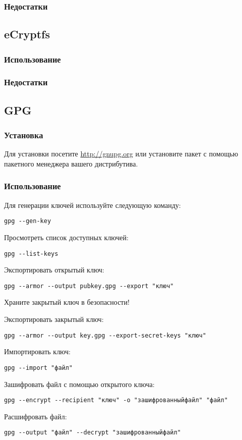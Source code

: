 \subsubsection{Недостатки}
\subsection{eCryptfs}
\subsubsection{Использование}
\subsubsection{Недостатки}
\subsection{GPG}
\subsubsection{Установка}
Для установки посетите \url{http://gnupg.org} или установите пакет с помощью пакетного менеджера вашего дистрибутива.
\subsubsection{Использование}
Для генерации ключей используйте следующую команду:
\begin{lstlisting}
gpg --gen-key
\end{lstlisting}
Просмотреть список доступных ключей:
\begin{lstlisting}
gpg --list-keys
\end{lstlisting}
Экспортировать открытый ключ:
\begin{lstlisting}
gpg --armor --output pubkey.gpg --export "ключ"
\end{lstlisting}
\begin{important}
Храните закрытый ключ в безопасности!
\end{important}
Экспортировать закрытый ключ:
\begin{lstlisting}
gpg --armor --output key.gpg --export-secret-keys "ключ"
\end{lstlisting}
Импортировать ключ:
\begin{lstlisting}
gpg --import "файл"
\end{lstlisting}
Зашифровать файл с помощью открытого ключа:
\begin{lstlisting}
gpg --encrypt --recipient "ключ" -o "зашифрованныйфайл" "файл"
\end{lstlisting}
Расшифровать файл:
\begin{lstlisting}
gpg --output "файл" --decrypt "зашифрованныйфайл"
\end{lstlisting}
